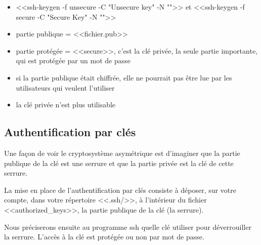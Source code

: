 \documentclass[11pt]{article}
\begin{document}
\begin{solution}
\begin{itemize}
 \item <<ssh-keygen -f unsecure -C "Unsecure key" -N "">> et <<ssh-keygen -f secure -C "Secure Key" -N "">>
 \item partie publique = <<fichier.pub>>
 \item partie protégée = <<secure>>, c'est la clé privée, la seule partie importante, qui est protégée par un mot de passe
 \item si la partie publique était chiffrée, elle ne pourrait pas être lue par les utilisateurs qui veulent l'utiliser
 \item la clé privée n'est plus utilisable
\end{itemize}
\end{solution}

\subsection{Authentification par clés}

Une façon de voir le cryptosystème asymétrique est d'imaginer que la partie publique de la clé est une serrure et que la
partie privée est la clé de cette serrure.

La mise en place de l'authentification par clés consiste à déposer, sur votre compte, dans votre répertoire <<.ssh/>>, à
l’intérieur du fichier <<authorized\_keys>>, la partie publique de la clé (la serrure).

Nous préciserons ensuite au programme ssh quelle clé utiliser pour déverrouiller la serrure. L'accès à la clé est protégée
ou non par mot de passe.
\end{document}
